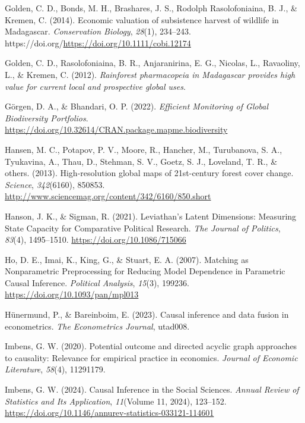\documentclass[
]{article}
\newlength{\cslhangindent}
\newenvironment{CSLReferences}[2] %
 {\begin{list}{}{%
  \setlength{\itemindent}{0pt}
  \setlength{\leftmargin}{0pt}
  \setlength{\parsep}{0pt}
  \ifodd #1
   \setlength{\leftmargin}{\cslhangindent}
   \setlength{\itemindent}{-1\cslhangindent}
  \fi
  \setlength{\itemsep}{#2\baselineskip}}}
 {\end{list}}
\begin{document}
\begin{CSLReferences}{1}{0}
Golden, C. D., Bonds, M. H., Brashares, J. S., Rodolph Rasolofoniaina,
B. J., \& Kremen, C. (2014). Economic valuation of subsistence harvest
of wildlife in {Madagascar}. \emph{Conservation Biology}, \emph{28}(1),
234--243. https://doi.org/\url{https://doi.org/10.1111/cobi.12174}

Golden, C. D., Rasolofoniaina, B. R., Anjaranirina, E. G., Nicolas, L.,
Ravaoliny, L., \& Kremen, C. (2012). \emph{Rainforest pharmacopeia in
{Madagascar} provides high value for current local and prospective
global uses}.

Görgen, D. A., \& Bhandari, O. P. (2022). \emph{Efficient {Monitoring}
of {Global} {Biodiversity} {Portfolios}}.
\url{https://doi.org/10.32614/CRAN.package.mapme.biodiversity}

Hansen, M. C., Potapov, P. V., Moore, R., Hancher, M., Turubanova, S.
A., Tyukavina, A., Thau, D., Stehman, S. V., Goetz, S. J., Loveland, T.
R., \& others. (2013). High-resolution global maps of 21st-century
forest cover change. \emph{Science}, \emph{342}(6160), 850853.
\url{http://www.sciencemag.org/content/342/6160/850.short}

Hanson, J. K., \& Sigman, R. (2021). Leviathan's {Latent} {Dimensions}:
{Measuring} {State} {Capacity} for {Comparative} {Political} {Research}.
\emph{The Journal of Politics}, \emph{83}(4), 1495--1510.
\url{https://doi.org/10.1086/715066}

Ho, D. E., Imai, K., King, G., \& Stuart, E. A. (2007). Matching as
Nonparametric Preprocessing for Reducing Model Dependence in Parametric
Causal Inference. \emph{Political Analysis}, \emph{15}(3), 199236.
\url{https://doi.org/10.1093/pan/mpl013}

Hünermund, P., \& Bareinboim, E. (2023). Causal inference and data
fusion in econometrics. \emph{The Econometrics Journal}, utad008.

Imbens, G. W. (2020). Potential outcome and directed acyclic graph
approaches to causality: Relevance for empirical practice in economics.
\emph{Journal of Economic Literature}, \emph{58}(4), 11291179.

Imbens, G. W. (2024). Causal {Inference} in the {Social} {Sciences}.
\emph{Annual Review of Statistics and Its Application}, \emph{11}(Volume
11, 2024), 123--152.
\url{https://doi.org/10.1146/annurev-statistics-033121-114601}


\end{CSLReferences}
\end{document}
